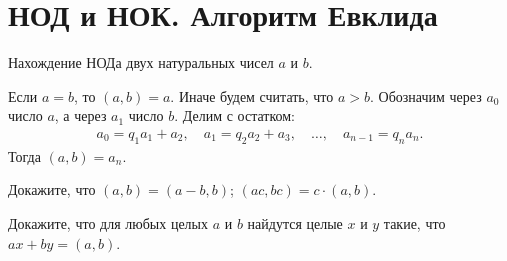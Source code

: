 
\section*{НОД и НОК. Алгоритм Евклида}




Нахождение НОДа двух натуральных чисел $a$ и $b$.
\par
Если $a = b$, то $(a, b) = a$.
Иначе будем считать, что $a > b$.
Обозначим через $a_0$ число $a$, а через $a_1$ число $b$.
Делим с остатком:
\begin{gather*}
    a_0 = q_1 a_1 + a_2
,\quad
    a_1 = q_2 a_2 + a_3
,\quad\ldots,\quad
    a_{n-1} = q_n a_n
.\end{gather*}
Тогда $(a, b) = a_n$.

\setcounter{jeolmsubproblem}{0}
Докажите, что
\quad
\subproblem $(a, b) = (a - b, b)$;
\quad
\subproblem $(a c, b c) = c \cdot (a, b)$.

Докажите, что для любых целых $a$ и $b$ найдутся целые $x$ и $y$ такие, что
$a x + b y = (a, b)$.

